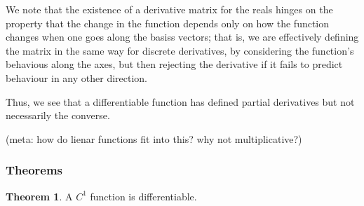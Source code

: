\documentclass{article}
\theoremstyle{definition}
\newtheorem{thm}{Theorem}[subsubsection]
\begin{document}
We note that the existence of a derivative matrix for the reals hinges on the property that the change in the function depends only on how the function changes when one goes along the basiss vectors; that is, we are effectively defining the matrix in the same way for discrete derivatives, by considering the function's behavious along the axes, but then rejecting the derivative if it fails to predict behaviour in any other direction.

Thus, we see that a differentiable function has defined partial derivatives but not necessarily the converse.

(meta: how do lienar functions fit into this? why not multiplicative?)

\subsubsection{Theorems}
\begin{thm}
	A $C^1$ function is differentiable.
\end{thm}
\end{document}
